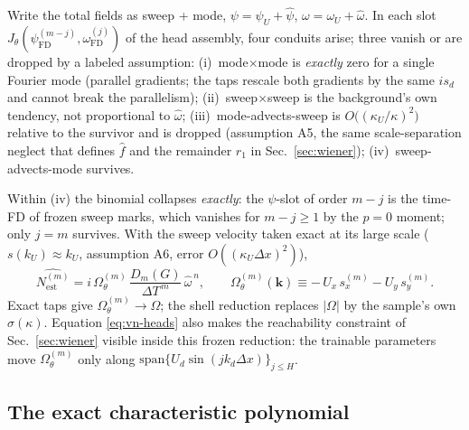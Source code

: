 \documentclass[11pt]{article}
\theoremstyle{plain}
\theoremstyle{definition}
\newcommand{\DT}{\Delta T}
\begin{document}
Write the total fields as sweep + mode, $\psi=\psi_U+\hat\psi$,
$\omega=\omega_U+\hat\omega$. In each slot
$J_\theta(\psi^{(m-j)}_{\mathrm{FD}},\omega^{(j)}_{\mathrm{FD}})$ of the
head assembly, four conduits arise; three vanish or are dropped by a
labeled assumption:
(i)~mode$\times$mode is \emph{exactly} zero for a single Fourier mode
(parallel gradients; the taps rescale both gradients by the same $is_d$
and cannot break the parallelism);
(ii)~sweep$\times$sweep is the background's own tendency, not
proportional to $\hat\omega$;
(iii)~mode-advects-sweep is $O\bigl((\kappa_U/\kappa)^2\bigr)$ relative
to the survivor and is dropped (assumption A5, the same scale-separation
neglect that defines $\hat f$ and the remainder $r_1$ in Sec.~\ref{sec:wiener});
(iv)~sweep-advects-mode survives.

Within (iv) the binomial collapses \emph{exactly}: the $\psi$-slot of
order $m-j$ is the time-FD of frozen sweep marks, which vanishes for
$m-j\ge1$ by the $p=0$ moment; only $j=m$ survives. With the sweep
velocity taken exact at its large scale ($s(k_U)\approx k_U$,
assumption A6, error $O((\kappa_U\Delta x)^2)$),
\begin{equation}
\widehat{N^{(m)}_{\mathrm{est}}}
= i\,\Omega^{(m)}_{\theta}\,\frac{D_m(G)}{\DT^{\,m}}\,\hat\omega^{\,n},
\qquad
\Omega^{(m)}_{\theta}(\mathbf{k})
\equiv -\,U_x\,s^{(m)}_x-U_y\,s^{(m)}_y .
\label{eq:vn-heads}
\end{equation}
Exact taps give $\Omega^{(m)}_\theta\to\Omega$; the shell reduction
replaces $|\Omega|$ by the sample's own $\hat\sigma(\kappa)$. Equation
\eqref{eq:vn-heads} also makes the reachability constraint of Sec.~\ref{sec:wiener}
visible inside this frozen reduction: the trainable parameters move
$\Omega^{(m)}_\theta$ only along
$\mathrm{span}\{U_d\sin(jk_d\Delta x)\}_{j\le H}$.

\subsection{The exact characteristic polynomial}
\end{document}
